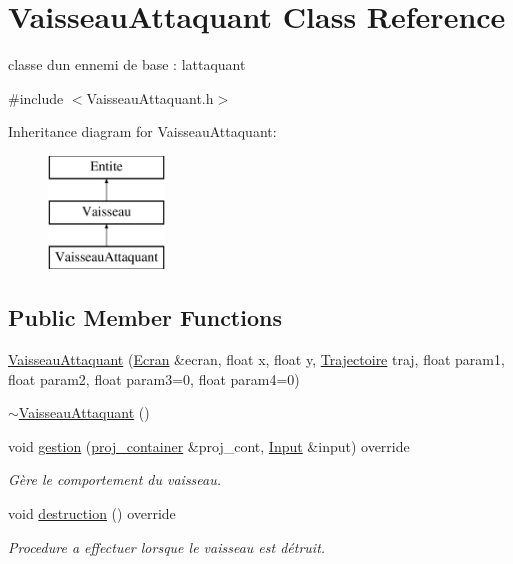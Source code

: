 \hypertarget{class_vaisseau_attaquant}{}\section{Vaisseau\+Attaquant Class Reference}
\label{class_vaisseau_attaquant}


classe d\textquotesingle{}un ennemi de base \+: l\textquotesingle{}attaquant  




{\ttfamily \#include $<$Vaisseau\+Attaquant.\+h$>$}

Inheritance diagram for Vaisseau\+Attaquant\+:\begin{figure}[H]
\begin{center}
\leavevmode
\includegraphics[height=3.000000cm]{class_vaisseau_attaquant}
\end{center}
\end{figure}
\subsection*{Public Member Functions}
\begin{DoxyCompactItemize}
\item 
\mbox{\hyperlink{class_vaisseau_attaquant_af4eff1782c7e67adad4e23aec3e03333}{Vaisseau\+Attaquant}} (\mbox{\hyperlink{class_ecran}{Ecran}} \&ecran, float x, float y, \mbox{\hyperlink{_trajectoire_8h_afa7f6e8323d7ee755d93cd1f6019dd95}{Trajectoire}} traj, float param1, float param2, float param3=0, float param4=0)
\item 
\mbox{\hyperlink{class_vaisseau_attaquant_a2707dcc90692ba6132ec6aeb659d3620}{$\sim$\+Vaisseau\+Attaquant}} ()
\item 
void \mbox{\hyperlink{class_vaisseau_attaquant_aaa30cf9a9cd4319bbf418799019284d7}{gestion}} (\mbox{\hyperlink{def__type_8h_a87980cd8ee9533e561a73e8bbc728188}{proj\+\_\+container}} \&proj\+\_\+cont, \mbox{\hyperlink{_input_8h_a5588d60d674991c719a8df848313e966}{Input}} \&input) override
\begin{DoxyCompactList}\small\item\em Gère le comportement du vaisseau. \end{DoxyCompactList}\item 
void \mbox{\hyperlink{class_vaisseau_attaquant_a9afe1d07b85b6064c802205a1d0d777b}{destruction}} () override
\begin{DoxyCompactList}\small\item\em Procedure a effectuer lorsque le vaisseau est détruit. \end{DoxyCompactList}\end{DoxyCompactItemize}
